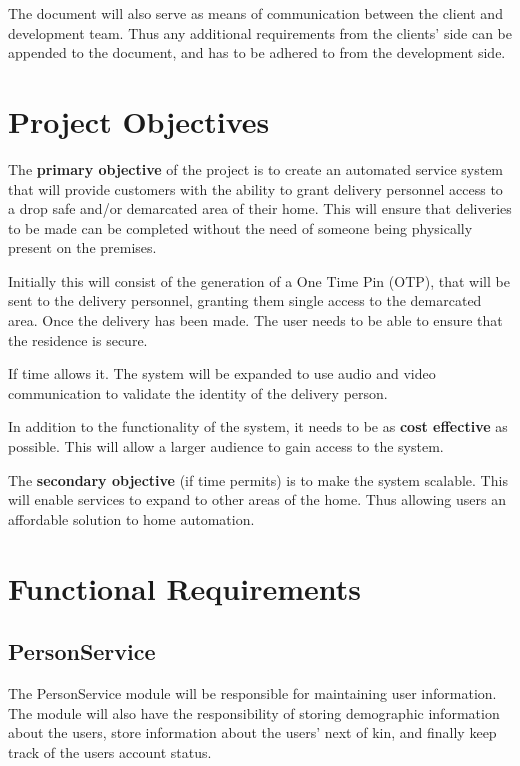 \documentclass[a4paper,12pt]{article}
\begin{document}
	{\noindent}The document will also serve as means of communication between the client and development team. Thus any additional requirements from the clients' side can be appended to the document, and has to be adhered to from the development side.
	
	\section{Project Objectives} The \textbf{primary objective} of the project is to create an automated service system that will provide customers with the ability to grant delivery personnel access to a drop safe and/or demarcated area of their home. This will ensure that deliveries to be made can be completed without the need of someone being physically present on the premises.
	
	{\noindent}Initially this will consist of the generation of a One Time Pin (OTP), that will be sent to the delivery personnel, granting them single access to the demarcated area. Once the delivery has been made. The user needs to be able to ensure that the residence is secure.
	
	{\noindent}If time allows it. The system will be expanded to use audio and video communication to validate the identity of the delivery person.
	
	{\noindent}In addition to the functionality of the system, it needs to be as \textbf{cost effective} as possible. This will allow a larger audience to gain access to the system. 
	
	{\noindent}The \textbf{secondary objective} (if time permits) is to make the system scalable. This will enable services to expand to other areas of the home. Thus allowing users an affordable solution to home automation.
	
	\newpage
	\section{Functional Requirements}
	
	\subsection{PersonService}
	The PersonService module will be responsible for maintaining user information. The module will also have the responsibility of storing demographic information about the users, store information about the users' next of kin, and finally keep track of the users account status.
	
\end{document}

